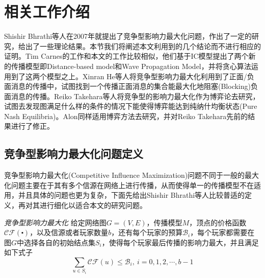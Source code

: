 



\section{相关工作介绍}
Shishir Bhrathi\cite{bharathi2007competitive}等人在2007年就提出了竞争型影响力最大化问题，作出了一定的研究，给出了一些理论结果。本节我们将阐述本文利用到的几个结论而不进行相应的证明。Tim Carnes\cite{carnes2007maximizing}的工作和本文的工作比较相似，他们基于IC模型提出了两个新的传播模型即Distance-based model和Wave Propagation Model，并将贪心算法运用到了这两个模型之上。Xinran He\cite{he2012influence}等人将竞争型影响力最大化利用到了正面/负面消息的传播中，试图找到一个传播正面消息的集合能最大化地阻塞(Blocking)负面消息的传播。Reiko Takehara\cite{takehara2012comment}等人将竞争型的影响力最大化作为博弈论去研究，试图去发现图满足什么样的条件的情况下能使得博弈能达到纯纳什均衡状态(Pure Nash Equilibria)。Alon\cite{alon2010note}同样适用博弈方法去研究，并对Reiko Takehara先前的结果进行了修正。


\subsection{竞争型影响力最大化问题定义}
\label{sec:chap4:def-for-problem}
竞争型影响力最大化(Competitive Influence Maximization)问题不同于一般的最大化问题主要在于其有多个信源在网络上进行传播，从而使得单一的传播模型不在适用，并且具体的问题也更为复杂，下面先给出Shishir Bhrathi\cite{bharathi2007competitive}等人比较普适的定义，再对其进行细化以适合本文的研究问题。

\begin{definition}
\label{def:chap4-bhrathi-kempe-cim}
\emph{竞争型影响力最大化}
给定网络图$G=(V,E)$，传播模型$M$，顶点的价格函数$\mathcal{CF}(\centerdot)$，以及信源或者玩家数量$b$，还有每个玩家的预算$\mathcal{B}_{i}$，每个玩家都需要在图$G$中选择各自的初始结点集$S_{i}$，使得每个玩家最后传播的影响力最大，并且满足如下式子
\begin{displaymath}
\sum_{u \in S_{i}}\mathcal{CF}(u) \leq \mathcal{B}_{i}, ~i=0,1,2,\cdots,b-1
\end{displaymath}
\end{definition}


